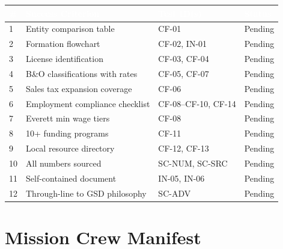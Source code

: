 \documentclass[11pt,letterpaper]{article}
\newcommand{\tableheader}[1]{\textbf{\sffamily\textcolor{white}{#1}}}
\begin{document}
\begin{center}
\begin{tabularx}{\textwidth}{C{0.5cm}XL{3cm}C{1.5cm}}
\toprule
{}
\tableheader{\#} & \tableheader{Success Criterion} & \tableheader{Test ID(s)} & \tableheader{Status} \\
 & Entity comparison table & CF-01 & Pending \\
2 & Formation flowchart & CF-02, IN-01 & Pending \\
3 & License identification & CF-03, CF-04 & Pending \\
4 & B\&O classifications with rates & CF-05, CF-07 & Pending \\
5 & Sales tax expansion coverage & CF-06 & Pending \\
6 & Employment compliance checklist & CF-08--CF-10, CF-14 & Pending \\
7 & Everett min wage tiers & CF-08 & Pending \\
8 & 10+ funding programs & CF-11 & Pending \\
9 & Local resource directory & CF-12, CF-13 & Pending \\
10 & All numbers sourced & SC-NUM, SC-SRC & Pending \\
11 & Self-contained document & IN-05, IN-06 & Pending \\
12 & Through-line to GSD philosophy & SC-ADV & Pending \\
\bottomrule
\end{tabularx}
\end{center}

\section{Mission Crew Manifest}
\end{document}
